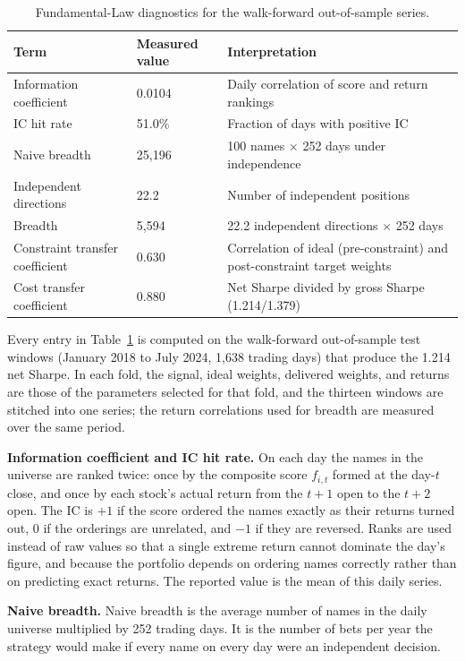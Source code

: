 \documentclass[11pt]{article}
\begin{document}
\begin{table}[H]
\centering
\caption{Fundamental-Law diagnostics for the walk-forward out-of-sample series.}
\label{tab:fundlaw}
\small
\begin{tabular}{p{}p{}p{}}
\toprule
Term & Measured value & Interpretation \\
\midrule
Information coefficient & 0.0104 & Daily correlation of score and return rankings \\
IC hit rate & 51.0\% & Fraction of days with positive IC \\
Naive breadth & 25,196 & 100 names $\times$ 252 days under independence \\
Independent directions & 22.2 & Number of independent positions \\
Breadth & 5,594 & 22.2 independent directions $\times$ 252 days \\
Constraint transfer coefficient & 0.630 & Correlation of ideal (pre-constraint) and post-constraint target weights \\
Cost transfer coefficient & 0.880 & Net Sharpe divided by gross Sharpe (1.214/1.379) \\
\bottomrule
\end{tabular}
\end{table}

Every entry in Table~\ref{tab:fundlaw} is computed on the walk-forward out-of-sample test windows (January 2018 to July 2024, 1,638 trading days) that produce the 1.214 net Sharpe. In each fold, the signal, ideal weights, delivered weights, and returns are those of the parameters selected for that fold, and the thirteen windows are stitched into one series; the return correlations used for breadth are measured over the same period.

\textbf{Information coefficient and IC hit rate.} On each day the names in the universe are ranked twice: once by the composite score $f_{i,t}$ formed at the day-$t$ close, and once by each stock's actual return from the $t+1$ open to the $t+2$ open. The IC is $+1$ if the score ordered the names exactly as their returns turned out, 0 if the orderings are unrelated, and $-1$ if they are reversed. Ranks are used instead of raw values so that a single extreme return cannot dominate the day's figure, and because the portfolio depends on ordering names correctly rather than on predicting exact returns. The reported value is the mean of this daily series.

\textbf{Naive breadth.} Naive breadth is the average number of names in the daily universe multiplied by 252 trading days. It is the number of bets per year the strategy would make if every name on every day were an independent decision.
\end{document}
